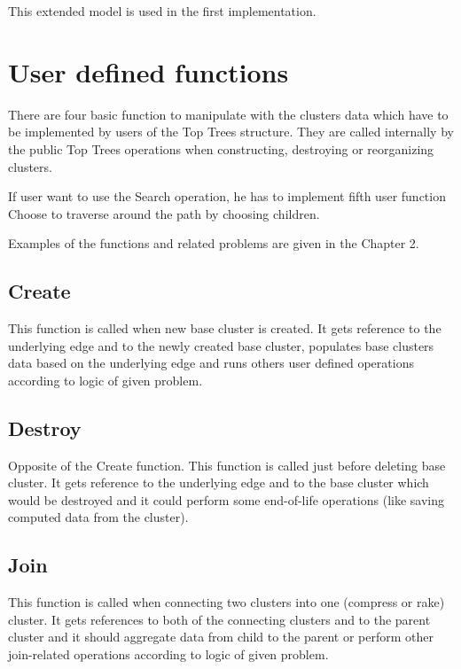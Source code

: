 
This extended model is used in the first implementation.




\section{User defined functions}

There are four basic function to manipulate with the clusters data which have to
be implemented by users of the Top Trees structure. They are called internally
by the public Top Trees operations when constructing, destroying or reorganizing
clusters.

If user want to use the {\I Search} operation, he has to implement fifth user
function {\I Choose} to traverse around the path by choosing children.

Examples of the functions and related problems are given in the Chapter 2.

\subsection{Create}

This function is called when new base cluster is created. It gets reference to
the underlying edge and to the newly created base cluster, populates base
clusters data based on the underlying edge and runs others user defined
operations according to logic of given problem.

\subsection{Destroy}

Opposite of the Create function. This function is called just before deleting
base cluster. It gets reference to the underlying edge and to the base cluster
which would be destroyed and it could perform some end-of-life operations (like
saving computed data from the cluster).

\subsection{Join}

This function is called when connecting two clusters into one (compress or rake)
cluster. It gets references to both of the connecting clusters and to the parent
cluster and it should aggregate data from child to the parent or perform other
join-related operations according to logic of given problem.

